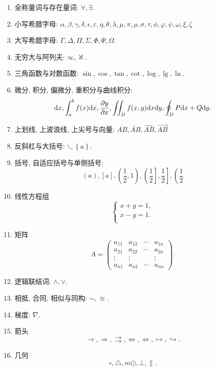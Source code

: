 \documentclass[a4paper, 11pt, UTF8]{article}
\def\d{\textup{d}}
\theoremstyle{plain}
\theoremstyle{definition}
\theoremstyle{remark}
\begin{document}
\begin{enumerate}
		\item 全称量词与存在量词: $ \forall, \exists $.
		
		\item 小写希腊字母: $ \alpha, \beta, \gamma, \delta, \epsilon, \varepsilon, \eta, \theta, \lambda, \mu, \pi, \rho, \sigma, \tau, \phi, \varphi, \psi, \omega, \xi, \zeta $
		
		\item 大写希腊字母: $\Gamma, \Delta, \Pi, \Sigma, \Phi, \Psi, \Omega$.
		
		\item 无穷大与阿列夫: $ \infty, \aleph $.
		
		\item 三角函数与对数函数: $ \sin, \cos, \tan, \cot, \log, \lg, \ln $.
		
		\item 微分, 积分, 偏微分, 重积分与曲线积分:
		\[ \d x, \int_a^b f(x)\d x, \frac{\partial y}{\partial x}, \iint_D f(x, y) \d x\d y, \oint_D P\d x+Q\d y. \]
		
		\item 上划线, 上波浪线, 上尖号与向量: $ \overline{AB}, \widetilde{AB}, \widehat{AB}, \overrightarrow{AB} $
		
		\item 反斜杠与大括号: $ \backslash, \left\{a\right\} $.
		
		\item 括号, 自适应括号与单侧括号:
		\[ (a), [a], \left(\frac{1}{2}, 1\right), \left(\frac{1}{2}\right], \left.\frac{1}{2}\right], \left(\frac{1}{2}\right. \]
		
		\item 线性方程组
		\[ \left\{\begin{array}{l}
			x+y=1, \\
			x-y=1. \\
		\end{array}\right. \]
	
		\item 矩阵
		\[ A=\left( \begin{array}{*{20}{c}}
		a_{11}	& a_{12} & \cdots & a_{1n} \\
		a_{21}	& a_{22} & \cdots & a_{2n} \\
		\vdots	& \vdots &  & \vdots \\
		a_{n1}	& a_{n2} & \cdots & a_{nn} 
		\end{array} \right).\]
		
		\item 逻辑联结词: $ \wedge, \vee $.
		
		\item 相抵, 合同, 相似与同构: $ \sim, \cong $.
		
		\item 梯度: $ \nabla $.
		
		\item 箭头
		\[ \rightarrow, \Rightarrow, \rightrightarrows, \Leftrightarrow, \iff, \mapsto, \hookrightarrow. \]
		
		\item 几何
		\[ \circ, \triangle,m \odot, \bot, \parallel. \]		
	\end{enumerate}
\end{document}
